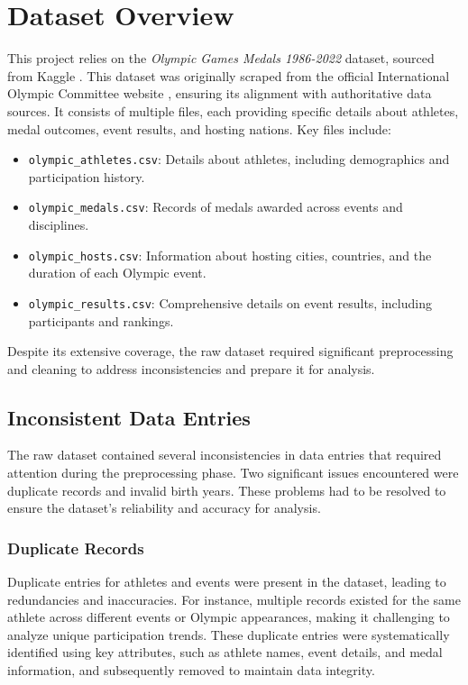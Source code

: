 \chapter{Dataset Overview} \label{chap:dataset}

This project relies on the \textit{Olympic Games Medals 1986-2022} dataset, sourced from Kaggle \cite{olympic_19862022}. This dataset was originally scraped from the official International Olympic Committee website \cite{olympics}, ensuring its alignment with authoritative data sources. It consists of multiple files, each providing specific details about athletes, medal outcomes, event results, and hosting nations. Key files include:

\begin{itemize}
    \item \texttt{olympic\_athletes.csv}: Details about athletes, including demographics and participation history.
    \item \texttt{olympic\_medals.csv}: Records of medals awarded across events and disciplines.
    \item \texttt{olympic\_hosts.csv}: Information about hosting cities, countries, and the duration of each Olympic event.
    \item \texttt{olympic\_results.csv}: Comprehensive details on event results, including participants and rankings.
\end{itemize}

Despite its extensive coverage, the raw dataset required significant preprocessing and cleaning to address inconsistencies and prepare it for analysis.

\section{Inconsistent Data Entries}

The raw dataset contained several inconsistencies in data entries that required attention during the preprocessing phase. Two significant issues encountered were duplicate records and invalid birth years. These problems had to be resolved to ensure the dataset's reliability and accuracy for analysis.

\subsection{Duplicate Records}

Duplicate entries for athletes and events were present in the dataset, leading to redundancies and inaccuracies. For instance, multiple records existed for the same athlete across different events or Olympic appearances, making it challenging to analyze unique participation trends. These duplicate entries were systematically identified using key attributes, such as athlete names, event details, and medal information, and subsequently removed to maintain data integrity.

